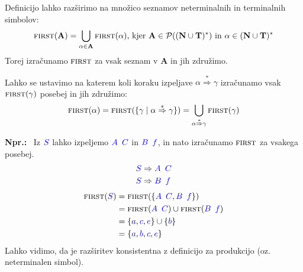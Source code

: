 \documentclass{article}
\newcommand{\Ex}{\textbf{Npr.:}\ }
\newcommand{\FIRST}{\textsc{first}}
\newcommand{\Set}[1]{\mathbf{#1}}
\newcommand{\Symbol}[1]{\textcolor{blue}{#1}}
\newcommand{\Terminals}{\Set{T}}
\newcommand{\NonTerminals}{\Set{N}}
\newcommand{\Powerset}[1]{\mathcal{P}(#1)}
\newcommand{\Derive}{\Rightarrow}
\newcommand{\DeriveStar}{\overset{\ast}{\Rightarrow}}
\newcommand{\Seq}{{\ \,}}
\newcommand{\Kleene}[1]{#1^\ast}
\begin{document}
Definicijo lahko razširimo na množico seznamov neterminalnih in terminalnih simbolov:
\begin{equation*}
  \FIRST(\Set{A}) = \bigcup_{\alpha \in \Set{A}} \FIRST(\alpha) \text{, kjer } \Set{A} \in \Powerset{\Kleene{(\NonTerminals \cup \Terminals)}} \text{ in } \alpha \in \Kleene{(\NonTerminals \cup \Terminals)}
\end{equation*}
Torej izračunamo $\FIRST$ za vsak seznam v $\Set{A}$ in jih združimo.

Lahko se ustavimo na katerem koli koraku izpeljave $\alpha \DeriveStar \gamma$ izračunamo vsak $\FIRST(\gamma)$ posebej in jih združimo:
\begin{equation*}
  \FIRST(\alpha) = \FIRST(\{\gamma \mid \alpha \DeriveStar \gamma\}) = \bigcup_{\alpha \DeriveStar \gamma} \FIRST(\gamma)
\end{equation*}

\Ex
  Iz $\Symbol{S}$ lahko izpeljemo $\Symbol{A} \Seq \Symbol{C}$ in $\Symbol{B} \Seq \Symbol{f}$, in nato izračunamo $\FIRST$ za vsakega posebej.
  \begin{align*}
    \Symbol{S} &\Derive \Symbol{A} \Seq \Symbol{C}\\
    \Symbol{S} &\Derive \Symbol{B} \Seq \Symbol{f}
  \end{align*}
  \begin{align*}
    \FIRST(\Symbol{S}) &= \FIRST(\{\Symbol{A} \Seq \Symbol{C}, \Symbol{B} \Seq \Symbol{f}\}) \\
              &= \FIRST(\Symbol{A} \Seq \Symbol{C}) \cup \FIRST(\Symbol{B} \Seq \Symbol{f})\\
              &= \{\Symbol{a}, \Symbol{c}, \Symbol{e}\} \cup \{\Symbol{b}\} \\
              &= \{\Symbol{a}, \Symbol{b}, \Symbol{c}, \Symbol{e}\}
  \end{align*}
  Lahko vidimo, da je razširitev konsistentna z definicijo za produkcijo (oz. neterminalen simbol).
\end{document}
